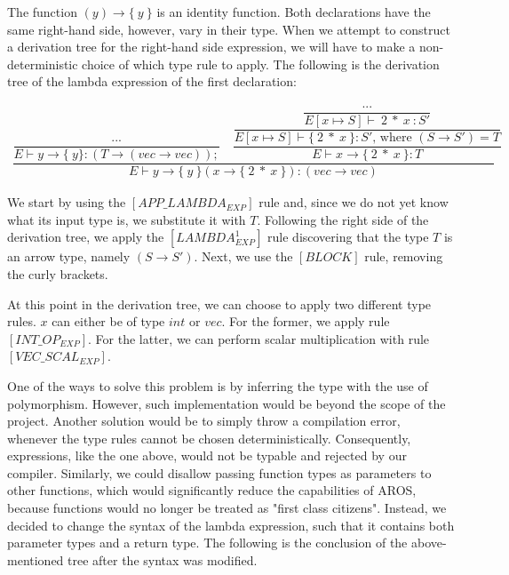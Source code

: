 \par
\newblock
The function $(y) \rightarrow \{ \: y \: \}$ is an identity function. Both declarations have the same right-hand side, however, vary in their type. When we attempt to construct a derivation tree for the right-hand side expression, we will have to make a non-deterministic choice of which type rule to apply. The following is the derivation tree of the lambda expression of the first declaration: 

\begin{align*}
    \dfrac
    {
        \dfrac
        {...}
        {E \vdash y \rightarrow \{ \: y \} \colon (T \rightarrow (vec \rightarrow vec));}
        \quad
        \dfrac
        {
            \dfrac
            {
                \dfrac
                {...}
                {E[x \longmapsto S] \vdash \: 2 \: * \: x \: \colon S'}
            }
            {E[x \longmapsto S] \vdash \{ \: 2 \: * \: x \: \} \colon S' \text{, where } (S \rightarrow S') = T}
        }
        {E \vdash x \rightarrow \{ \: 2 \: * \: x \: \} \colon T}
    }
    {
        E \vdash y \rightarrow \{ \: y \: \}(x \rightarrow \{ \: 2 \: * \: x \: \}) \colon (vec \rightarrow vec)
    }
\end{align*}

\newblock
\par
We start by using the $[APP\_LAMBDA_{EXP}]$ rule and, since we do not yet know what its input type is, we substitute it with $T$. Following the right side of the derivation tree, we apply the $[LAMBDA^1_{EXP}]$ rule discovering that the type $T$ is an arrow type, namely $(S \rightarrow S')$. Next, we use the $[BLOCK]$ rule, removing the curly brackets. 

\par
At this point in the derivation tree, we can choose to apply two different type rules. $x$ can either be of type $int$ or $vec$. For the former, we apply rule $[INT\_OP_{EXP}]$. For the latter, we can perform scalar multiplication with rule $[VEC\_SCAL_{EXP}]$.

\par
One of the ways to solve this problem is by inferring the type with the use of polymorphism. However, such implementation would be beyond the scope of the project. Another solution would be to simply throw a compilation error, whenever the type rules cannot be chosen deterministically. Consequently, expressions, like the one above, would not be typable and rejected by our compiler. Similarly, we could disallow passing function types as parameters to other functions, which would significantly reduce the capabilities of AROS, because functions would no longer be treated as "first class citizens". Instead, we decided to change the syntax of the lambda expression, such that it contains both parameter types and a return type. The following is the conclusion of the above-mentioned tree after the syntax was modified.

